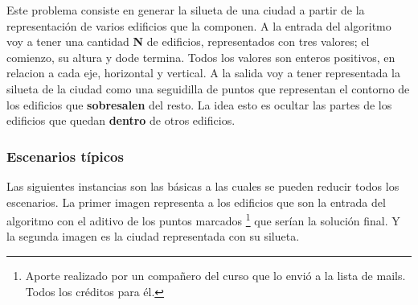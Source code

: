 Este problema consiste en generar la silueta de una ciudad a partir de la representaci\'on de varios edificios que la componen.
A la entrada del algoritmo voy a tener una cantidad \textbf{N} de edificios, representados con tres valores; el comienzo, su altura y dode termina. Todos los valores son enteros positivos, en relacion a cada eje, horizontal y vertical.
A la salida voy a tener representada la silueta de la ciudad como una seguidilla de puntos que representan el contorno de los edificios que \textbf{sobresalen} del resto.
La idea esto es ocultar las partes de los edificios que quedan \textbf{dentro} de otros edificios.

\subsubsection*{Escenarios t\'ipicos}

Las siguientes instancias son las b\'asicas a las cuales se pueden reducir todos los escenarios. La primer imagen representa a los edificios que son la entrada del algoritmo con el aditivo de los puntos marcados \footnote{Aporte realizado por un compañero del curso que lo envió a la lista de mails. Todos los créditos para \'el.} que ser\'ian la solución final. Y la segunda imagen es la ciudad representada con su silueta.

